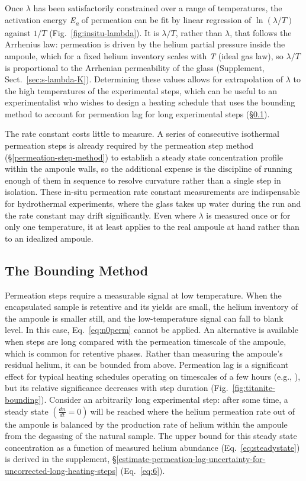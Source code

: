 Once \(\lambda\) has been satisfactorily constrained over a range of temperatures, the activation energy \emph{E\textsubscript{a}} of permeation can be fit by linear regression of \(\ln(\lambda/T)\) against \(1/T\) (Fig.~\ref{fig:insitu-lambda}). It is \(\lambda/T\), rather than \(\lambda\), that follows the Arrhenius law: permeation is driven by the helium partial pressure inside the ampoule, which for a fixed helium inventory scales with \emph{T} (ideal gas law), so \(\lambda/T\) is proportional to the Arrhenian permeability of the glass (Supplement, Sect.~\ref{sec:s-lambda-K}). Determining these values allows for extrapolation of \(\lambda\) to the high temperatures of the experimental steps, which can be useful to an experimentalist who wishes to design a heating schedule that uses the bounding method to account for permeation lag for long experimental steps (\S\ref{bounding-method}).

The rate constant costs little to measure. A series of consecutive isothermal permeation steps is already required by the permeation step method (\S\ref{permeation-step-method}) to establish a steady state concentration profile within the ampoule walls, so the additional expense is the discipline of running enough of them in sequence to resolve curvature rather than a single step in isolation. These in-situ permeation rate constant measurements are indispensable for hydrothermal experiments, where the glass takes up water during the run and the rate constant may drift significantly. Even where $\lambda$ is measured once or for only one temperature, it at least applies to the real ampoule at hand rather than to an idealized ampoule.

\subsection{The Bounding Method}\label{bounding-method}

Permeation steps require a measurable signal at low temperature. When the encapsulated sample is retentive and its yields are small, the helium inventory of the ampoule is smaller still, and the low-temperature signal can fall to blank level. In this case, Eq.~\eqref{eq:n0perm} cannot be applied. An alternative is available when steps are long compared with the permeation timescale of the ampoule, which is common for retentive phases. Rather than measuring the ampoule's residual helium, it can be bounded from above. Permeation lag is a significant effect for typical heating schedules operating on timescales of a few hours (e.g., \citealp{farley2000,shuster2004}), but its relative significance decreases with step duration (Fig.~\ref{fig:titanite-bounding}). Consider an arbitrarily long experimental step: after some time, a steady state \(\left( \frac{dn}{dt} = 0 \right)\ \)will be reached where the helium permeation rate out of the ampoule is balanced by the production rate of helium within the ampoule from the degassing of the natural sample. The upper bound for this steady state concentration as a function of measured helium abundance (Eq.~\eqref{eq:steadystate}) is derived in the supplement, \S\ref{estimate-permeation-lag-uncertainty-for-uncorrected-long-heating-steps} (Eq.~\eqref{eq:6}).

